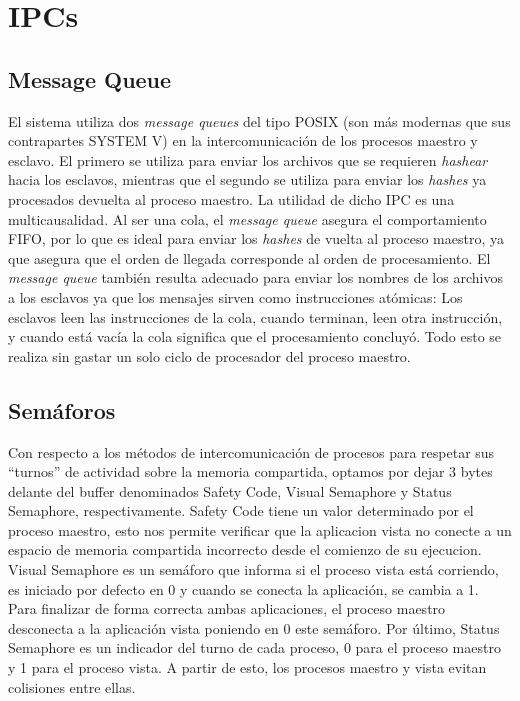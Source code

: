 \documentclass[10pt,a4paper]{report}
\begin{document}
\section{IPCs}
\subsection{Message Queue}
	El sistema utiliza dos \textit{message queues} del tipo POSIX (son más modernas que sus contrapartes SYSTEM V) en la intercomunicación de los procesos maestro y esclavo. El primero se utiliza para enviar los archivos que se requieren \textit{hashear} hacia los esclavos, mientras que el segundo se utiliza para enviar los \textit{hashes} ya procesados devuelta al proceso maestro. La utilidad de dicho IPC es una multicausalidad. Al ser una cola, el \textit{message queue} asegura el comportamiento FIFO, por lo que es ideal para enviar los \textit{hashes} de vuelta al proceso maestro, ya que asegura que el orden de llegada corresponde al orden de procesamiento. El \textit{message queue} también resulta adecuado para enviar los nombres de los archivos a los esclavos ya que los mensajes sirven como instrucciones atómicas: Los esclavos leen las instrucciones de la cola, cuando terminan, leen otra instrucción, y cuando está vacía la cola significa que el procesamiento concluyó. Todo esto se realiza sin gastar un solo ciclo de procesador del proceso maestro.
\subsection{Semáforos} 
Con respecto a los métodos de intercomunicación de procesos para respetar sus “turnos” de actividad sobre la memoria compartida, optamos por dejar 3 bytes delante del buffer denominados Safety Code, Visual Semaphore y Status Semaphore, respectivamente. 
Safety Code tiene un valor determinado por el proceso maestro, esto nos permite verificar que la aplicacion vista no conecte a un espacio de memoria compartida incorrecto desde el comienzo de su ejecucion. 
Visual Semaphore es un semáforo que informa si el proceso vista está corriendo, es iniciado por defecto en 0 y cuando se conecta la aplicación, se cambia a 1. Para finalizar de forma correcta ambas aplicaciones, el proceso maestro desconecta a la aplicación vista poniendo en 0 este semáforo.
Por último, Status Semaphore es un indicador del turno de cada proceso, 0 para el proceso maestro y 1 para el proceso vista. A partir de esto, los procesos maestro y vista evitan colisiones entre ellas. 
\end{document}
